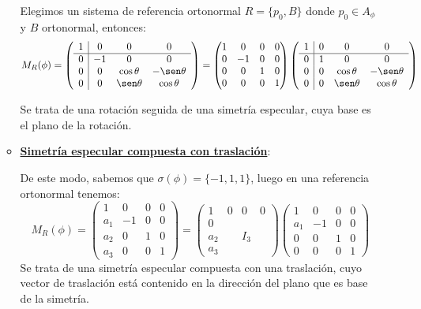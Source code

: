 \documentclass[10pt,a4paper,openright]{book}
\theoremstyle{break}
\begin{document}
\begin{itemize}
\begin{itemize}
Elegimos un sistema de referencia ortonormal $R=\{p_0, B\}$ donde $p_0\in A_\phi$ y $B$ ortonormal, entonces:
$$M_R (\phi) = \left(\begin{array}{c|ccc}
1 & 0  & 0 & 0 \\
\hline
0 & -1 &  0& 0    \\
0 & 0 &  \cos\theta  & -\sen\theta \\
0 & 0 &  \sen\theta & \cos\theta 
\end{array}
\right) = \begin{pmatrix} 1 & 0 & 0 & 0 \\ 0 & -1 & 0 & 0 \\ 0 & 0 & 1 & 0 \\ 0 & 0 & 0 & 1

\end{pmatrix} \left(\begin{array}{c|ccc}
1 & 0  & 0 & 0 \\
\hline
0 & 1 &  0& 0    \\
0 & 0 &  \cos\theta  & -\sen\theta \\
0 & 0 &  \sen\theta & \cos\theta 
\end{array}
\right) $$

Se trata de una rotación seguida de una simetría especular, cuya base es el plano de la rotación.

\item \underline{\textbf{Simetría especular compuesta con traslación}}: 

De este modo, sabemos que $\sigma (\phi)= \{-1 , 1 , 1\}$, luego en una referencia ortonormal tenemos:
$$ M_R (\phi) = \left(\begin{array}{c|ccc}
1 & 0  & 0 & 0 \\
\hline
a_1 & -1 &  0& 0    \\
a_2 & 0 & 1  & 0 \\
a_3 & 0 &  0 & 1
\end{array}
\right) =  \left(\begin{array}{c|ccc}
1 & 0  & 0 & 0 \\
\hline
0 &  &  &     \\
a_2 & & I_3   &  \\
a_3 &  &   &  
\end{array}
\right)  \left( \begin{array}{c|ccc}
1 & 0  & 0 & 0 \\
\hline
a_1 & -1 & 0 & 0   \\
0 &0 & 1   &0  \\
0 & 0 &  0 &  1
\end{array}
\right)$$
Se trata de una simetría especular compuesta con una traslación, cuyo vector de traslación está contenido en la dirección del plano que es base de la simetría.
\end{itemize}
\end{itemize}
\end{document}
